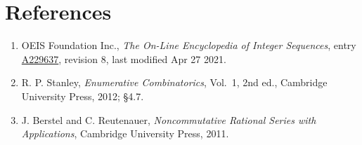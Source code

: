 \documentclass[11pt]{article}
\theoremstyle{definition}
\begin{document}
\section{References}

\begin{enumerate}

\item OEIS Foundation Inc., \emph{The On-Line Encyclopedia of Integer Sequences}, entry \href{https://oeis.org/A229637}{A229637}, revision 8, last modified Apr 27 2021.

\item R. P. Stanley, \emph{Enumerative Combinatorics}, Vol.~1, 2nd ed., Cambridge University Press, 2012; \S4.7.

\item J. Berstel and C. Reutenauer, \emph{Noncommutative Rational Series with Applications}, Cambridge University Press, 2011.

\end{enumerate}
\end{document}
